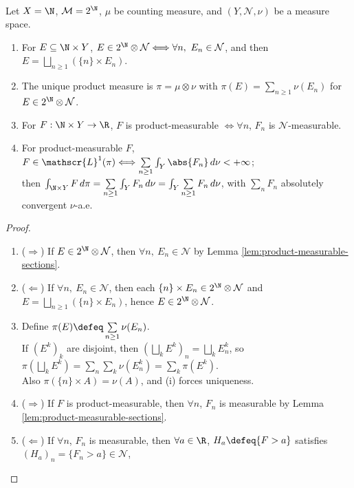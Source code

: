 \begin{proposition} \label{prop:counting-factor-product-integrals} \\
Let $X=\N$, $\mathcal{M}=2^\N$, $\mu$ be counting measure, and $(Y,\mathcal{N},\nu)$ be a measure space.
\begin{enumerate}[label=(\roman*)]
\setlength{\itemsep}{0pt}
\item For $E\subseteq\N\times Y$, $E\in2^\N\otimes\mathcal{N}\Longleftrightarrow \forall n,\ E_n\in\mathcal{N}$, and then $E=\bigsqcup\limits_{n\geq1}(\{n\}\times E_n)$.
\item The unique product measure is $\pi=\mu\otimes\nu$ with $\pi(E)=\sum\limits_{n\geq1}\nu(E_n)$ for $E\in2^\N\otimes\mathcal{N}$.
\item For $F:\N\times Y\to\R$, $F$ is product-measurable $\Longleftrightarrow \forall n$, $F_n$ is $\mathcal{N}$-measurable.
\item For product-measurable $F$, $F\in\mathscr{L}^1(\pi)\Longleftrightarrow\sum\limits_{n\geq1}\int_Y\abs{F_n}\,d\nu<+\infty$;\\
then $\int_{\N\times Y}F\,d\pi=\sum\limits_{n\geq1}\int_YF_n\,d\nu=\int_Y\sum\limits_{n\geq1}F_n\,d\nu$, with $\sum\limits_nF_n$ absolutely convergent $\nu$-a.e.
\end{enumerate}
\begin{proof}
\begin{enumerate}[label=(\roman*)]
\setlength{\itemsep}{0pt}
\item[$(i)$] ($\Rightarrow$) If $E\in2^\N\otimes\mathcal{N}$, then $\forall n,\ E_n\in\mathcal{N}$ by Lemma \ref{lem:product-measurable-sections}.
\item[$(i)$] ($\Leftarrow$) If $\forall n,\ E_n\in\mathcal{N}$, then each $\{n\}\times E_n\in2^\N\otimes\mathcal{N}$ and $E=\bigsqcup\limits_{n\geq1}(\{n\}\times E_n)$, hence $E\in2^\N\otimes\mathcal{N}$.
\item[$(ii)$] Define $\pi(E)\defeq\sum\limits_{n\geq1}\nu(E_n)$.\\
If $(E^k)_k$ are disjoint, then $(\bigsqcup\limits_kE^k)_n=\bigsqcup\limits_kE^k_n$, so $\pi(\bigsqcup\limits_kE^k)=\sum\limits_n\sum\limits_k\nu(E^k_n)=\sum\limits_k\pi(E^k)$.\\
Also $\pi(\{n\}\times A)=\nu(A)$, and (i) forces uniqueness.
\item[$(iii)$] ($\Rightarrow$) If $F$ is product-measurable, then $\forall n$, $F_n$ is measurable by Lemma \ref{lem:product-measurable-sections}.
\item[$(iii)$] ($\Leftarrow$) If $\forall n$, $F_n$ is measurable, then $\forall a\in\R$, $H_a\defeq\{F>a\}$ satisfies $(H_a)_n=\{F_n>a\}\in\mathcal{N}$,\\

\end{enumerate}
\end{proof}
\end{proposition}
